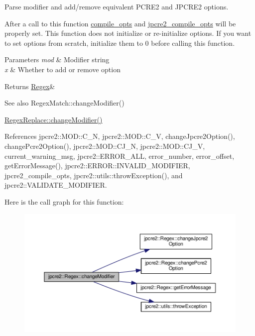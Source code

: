 Parse modifier and add/remove equivalent P\+C\+R\+E2 and J\+P\+C\+R\+E2 options. 

After a call to this function \hyperlink{classjpcre2_1_1Regex_a5954131e9085de63229ed5c11417df69}{compile\+\_\+opts} and \hyperlink{classjpcre2_1_1Regex_abdd26c3bc1c3132f0aa73dde1690a7ef}{jpcre2\+\_\+compile\+\_\+opts} will be properly set. This function does not initialize or re-\/initialize options. If you want to set options from scratch, initialize them to 0 before calling this function. 
\begin{DoxyParams}{Parameters}
{\em mod} & Modifier string \\
\hline
{\em x} & Whether to add or remove option \\
\hline
\end{DoxyParams}
\begin{DoxyReturn}{Returns}
\hyperlink{classjpcre2_1_1Regex}{Regex}\& 
\end{DoxyReturn}
\begin{DoxySeeAlso}{See also}
Regex\+Match\+::change\+Modifier() 

\hyperlink{classjpcre2_1_1RegexReplace_ae58d2a44ed474568554202612d45c814}{Regex\+Replace\+::change\+Modifier()} 
\end{DoxySeeAlso}


References jpcre2\+::\+M\+O\+D\+::\+C\+\_\+N, jpcre2\+::\+M\+O\+D\+::\+C\+\_\+V, change\+Jpcre2\+Option(), change\+Pcre2\+Option(), jpcre2\+::\+M\+O\+D\+::\+C\+J\+\_\+N, jpcre2\+::\+M\+O\+D\+::\+C\+J\+\_\+V, current\+\_\+warning\+\_\+msg, jpcre2\+::\+E\+R\+R\+O\+R\+\_\+\+A\+LL, error\+\_\+number, error\+\_\+offset, get\+Error\+Message(), jpcre2\+::\+E\+R\+R\+O\+R\+::\+I\+N\+V\+A\+L\+I\+D\+\_\+\+M\+O\+D\+I\+F\+I\+ER, jpcre2\+\_\+compile\+\_\+opts, jpcre2\+::utils\+::throw\+Exception(), and jpcre2\+::\+V\+A\+L\+I\+D\+A\+T\+E\+\_\+\+M\+O\+D\+I\+F\+I\+ER.



Here is the call graph for this function\+:\nopagebreak
\begin{figure}[H]
\begin{center}
\leavevmode
\includegraphics[width=350pt]{classjpcre2_1_1Regex_abc4a13f1baa8f23a8747fb0ffd46a836_cgraph}
\end{center}
\end{figure}


